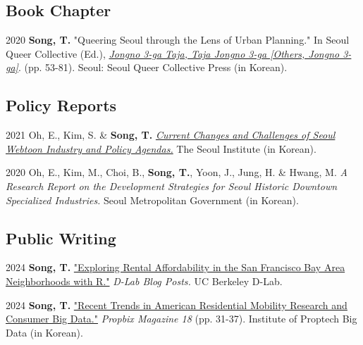 \documentclass[12pt,letterpaper]{report}
\begin{document}
    \subsection*{Book Chapter}
    \begin{tablist}
        \item[2020] \tab{}\textbf{Song, T.} "Queering Seoul through the Lens of Urban Planning." In Seoul Queer Collective (Ed.), \emph{\href{http://www.kyobobook.co.kr/product/detailViewKor.laf?ejkGb=KOR&mallGb=KOR&barcode=9791197096501}{Jongno 3-ga Taja, Taja Jongno 3-ga [Others, Jongno 3-ga]}}. (pp. 53-81). Seoul: Seoul Queer Collective Press (in Korean).
    \end{tablist}
    \subsection*{Policy Reports}
    \begin{tablist}
        \item[2021] \tab{}Oh, E., Kim, S. \& \textbf{Song, T.} \emph{\href{http://global.si.re.kr/content/current-changes-and-challenges-seoul-webtoon-industry-and-policy-agendas}{Current Changes and Challenges of Seoul Webtoon Industry and Policy Agendas.}} The Seoul Institute (in Korean).
        \item[2020] \tab{}Oh, E., Kim, M., Choi, B., \textbf{Song, T.}, Yoon, J., Jung, H. \& Hwang, M. \emph{A Research Report on the Development Strategies for Seoul Historic Downtown Specialized Industries.} Seoul Metropolitan Government (in Korean).
    \end{tablist}
    \subsection*{Public Writing}
    \begin{tablist}
    \item[2024] \tab{}\textbf{Song, T.} \href{https://medium.com/@dlab-berkeley/exploring-rental-affordability-in-the-san-francisco-bay-area-neighborhoods-with-r-c4383f7553e7}{"Exploring Rental Affordability in the San Francisco Bay Area Neighborhoods with R."} \emph{D-Lab Blog Posts.} UC Berkeley D-Lab.
    \item[2024] \tab{}\textbf{Song, T.} \href{https://www.kahps.org/data/prbx/pdf_44_7}{"Recent Trends in American Residential Mobility Research and Consumer Big Data."} \emph{Propbix Magazine 18} (pp. 31-37). Institute of Proptech Big Data (in Korean).
    \end{tablist}
\end{document}
